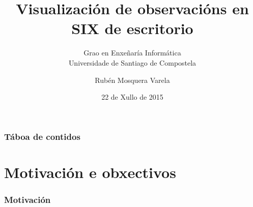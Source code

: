 \documentclass{beamer}
\begin{document}
\title{Visualización de observacións en SIX de escritorio}
\subtitle{Grao en Enxeñaría Informática \\
Universidade de Santiago de Compostela}  
\author{Rubén Mosquera Varela}
\date{22 de Xullo de 2015} 

\begin{frame}
\titlepage
\end{frame}

\begin{frame}
\frametitle{Táboa de contidos}\tableofcontents
\end{frame} 

\section{Motivación e obxectivos} 
\begin{frame}
\frametitle{Motivación} 
\end{frame}
%
%
%
%
%
\end{document}

